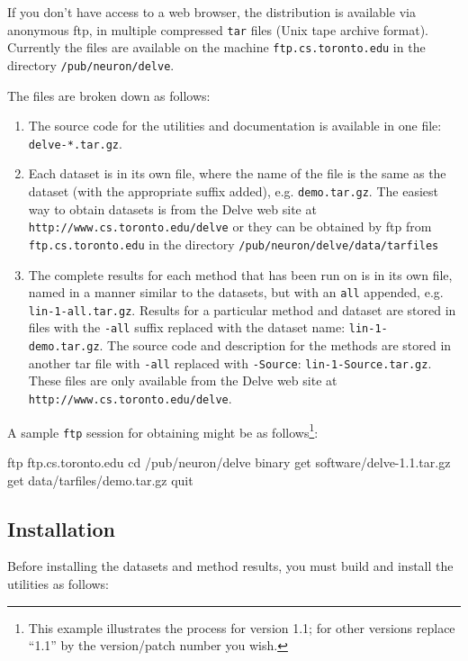 If you don't have access to a web browser, the \delve{} distribution
is available via anonymous ftp, in multiple compressed \texttt{tar}
files (Unix tape archive format).  Currently the files are available
on the machine \texttt{ftp.cs.toronto.edu} in the directory
\texttt{/pub/neuron/delve}.

The files are broken down as follows:
\begin{enumerate}
\item 
The source code for the \delve{} utilities and documentation is
available in one file: \texttt{delve-*.tar.gz}.
\item 
Each dataset is in its own file, where the name of the file is the
same as the dataset (with the appropriate suffix added),
e.g. \texttt{demo.tar.gz}.  The easiest way to obtain datasets is from the
Delve web site at \texttt{http://www.cs.toronto.edu/\maketilde{}delve} or they
can be obtained by ftp from  \texttt{ftp.cs.toronto.edu} in the directory
\texttt{/pub/neuron/delve/data/tarfiles} 

\item
The complete results for each method that has been run on \delve{} is
in its own file, named in a manner similar to the datasets, but with
an  \texttt{all} appended, e.g. \texttt{lin-1-all.tar.gz}.
Results for a particular method and dataset are stored in files with
the \texttt{-all} suffix replaced with the dataset name:
\texttt{lin-1-demo.tar.gz}.  The source code and description for the
methods are stored in another tar file with \texttt{-all} replaced
with \texttt{-Source}: \texttt{lin-1-Source.tar.gz}.  These files are only
available from the Delve web site at 
\texttt{http://www.cs.toronto.edu/\maketilde{}delve}.
\end{enumerate}

A sample \texttt{ftp} session for obtaining \delve{} might be as
follows\footnote{This example illustrates the process for version 1.1; for
other versions replace ``1.1'' by the version/patch number you wish.}:

\begin{Session}
ftp ftp.cs.toronto.edu
cd /pub/neuron/delve
binary
get software/delve-1.1.tar.gz
get data/tarfiles/demo.tar.gz
quit
\end{Session}

\subsection*{Installation}

Before installing the datasets and method results, you must build and
install the \delve{} utilities as follows:

